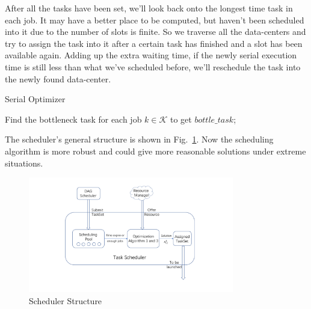 \documentclass{llncs}
\begin{document}
After all the tasks have been set, we'll look back onto the longest time task in each job. It may have a better place to be computed, but haven't been scheduled into it due to the number of slots is finite. So we traverse all the data-centers and try to assign the task into it after a certain task has finished and a slot has been available again. Adding up the extra waiting time, if the newly serial execution time is still less than what we've scheduled before, we'll reschedule the task into the newly found data-center.
\begin{algorithm}
\BlankLine
\caption{Serial Optimizer}
\label{alg:Serial}
\BlankLine
Find the bottleneck task for each job $k \in \mathcal{K}$ to get $bottle\_task$; \\
\end{algorithm}

The scheduler's general structure is shown in Fig.~\ref{fig:Structure}. Now the scheduling algorithm is more robust and could give more reasonable solutions under extreme situations.
\begin{figure}[htbp]
    \centering
    \includegraphics[width=0.8\textwidth]{Figures/SchedulerStructure.pdf}
    \caption{Scheduler Structure}
    \label{fig:Structure}
\end{figure}
\end{document}
